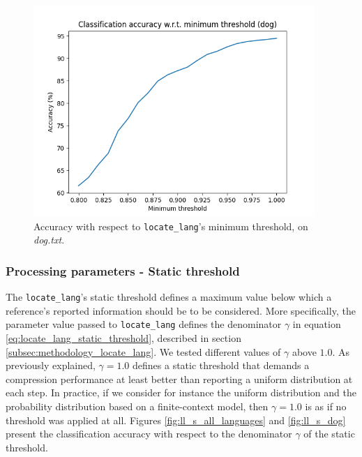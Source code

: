 \documentclass{article}
\begin{document}
\begin{figure}
    \centering
    \includegraphics[width=0.95\textwidth]{../results/dog/ll-m.png}
    \caption{Accuracy with respect to \texttt{locate\_lang}'s minimum threshold, on \textit{dog.txt}.}
    \label{fig:ll_m_dog}
\end{figure}

\subsubsection{Processing parameters - Static threshold}
\label{subsubsec:results_locate_lang_static_threshold_processing}

The \verb|locate_lang|'s static threshold defines a maximum value below which a reference's reported information should be to be considered.
More specifically, the parameter value passed to \verb|locate_lang| defines the denominator $\gamma$ in equation \ref{eq:locate_lang_static_threshold}, described in section \ref{subsec:methodology_locate_lang}.
We tested different values of $\gamma$ above $1.0$.
As previously explained, $\gamma = 1.0$ defines a static threshold that demands a compression performance at least better than reporting a uniform distribution at each step.
In practice, if we consider for instance the uniform distribution and the probability distribution based on a finite-context model, then $\gamma = 1.0$ is as if no threshold was applied at all.
Figures \ref{fig:ll_s_all_languages} and \ref{fig:ll_s_dog} present the classification accuracy with respect to the denominator $\gamma$ of the static threshold.
\end{document}
